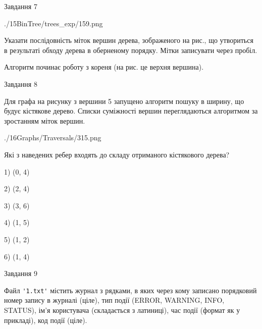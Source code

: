 \documentclass[12pt, ukrainian]{article}
\def\code#1{\Verb!#1!}
\begin{document}
{\vspace{10mm}\par

\newpage
\begin{minipage}[t]{9.7cm}
               
{\begin{center}Завдання {7}\end{center}}
\vspace{-6mm}

\begin{center}
	{./15BinTree/trees_exp/159.png}
\end{center}
Указати послідовність міток вершин дерева, зображеного на рис., що утвориться в результаті обходу дерева в оберненому порядку. Мітки записувати через пробіл.\par Алгоритм починає роботу з кореня (на рис. це верхня вершина).\par

\end{minipage}
\vline \hspace{8mm}
\begin{minipage}[t]{8.0cm}
               
{\begin{center}Завдання {8}\end{center}}
\vspace{-6mm}
Для графа на рисунку з вершини 5 запущено алгоритм пошуку в ширину, що будує кістякове дерево. Списки суміжності вершин переглядаються алгоритмом за зростанням міток вершин.\par
\begin{center}
	{./16Graphs/Traversals/315.png}
\end{center}
\par Які з наведених ребер входять до складу отриманого кістякового дерева?\par
1) (0, 4)\par
2) (2, 4)\par
3) (3, 6)\par
4) (1, 5)\par
5) (1, 2)\par
6) (1, 4)\par
{\vskip 15pt} \par

\end{minipage}

               
{\begin{center}Завдання {9}\end{center}}
\vspace{-6mm}
Файл \code{'1.txt'} містить журнал з рядками, в яких через кому записано поряд\-ко\-вий номер запису в журналі (ціле), тип події (ERROR, WARNING, INFO, STATUS), ім'я користувача (складається з латиниці), час події (фор\-мат як у прикладі), код події (ціле).

}
\end{document}
